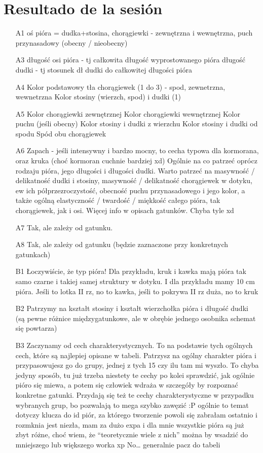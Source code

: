 \documentclass[a4paper,12pt]{article}
\begin{document}
\section{Resultado de la sesión}
\begin{itemize}
	\item[A1] oś pióra = dudka+stosina, chorągiewki - zewnętrzna i wewnętrzna, puch przynasadowy (obecny / nieobecny)
	\item[A3] długość osi pióra - tj całkowita długość wyprostowanego pióra
	długość dudki - tj stosunek dł dudki do całkowitej długości pióra
	\item[A4] Kolor podstawowy tła chorągiewek (1 do 3) - spod, zewnetrzna, wewnetrzna
	Kolor stosiny (wierzch, spod) i dudki (1)
	\item[A5] Kolor chorągiewki zewnętrznej
	Kolor chorągiewki wewnętrznej
	Kolor puchu (jeśli obecny)
	Kolor stosiny i dudki z wierzchu
	Kolor stosiny i dudki od spodu
	Spód obu chorągiewek
	\item[A6] Zapach - jeśli intensywny i bardzo mocny, to cecha typowa dla kormorana, oraz kruka (choć kormoran cuchnie bardziej xd)
	Ogólnie na co patrzeć oprócz rodzaju pióra, jego długości i długości dudki. Warto patrzeć na masywność / delikatność dudki i stosiny, masywność / delikatność chorągiewek w dotyku, ew ich półprzezroczystość, obecność puchu przynasadowego i jego kolor, a także ogólną elastyczność / twardość / miękkość całego pióra, tak chorągiewek, jak i osi. Więcej info w opisach gatunków. Chyba tyle xd
	\item[A7] Tak, ale zależy od gatunku.
	\item[A8] Tak, ale zależy od gatunku (będzie zaznaczone przy konkretnych gatunkach)
	\item[B1] Łoczywiście, że typ pióra! Dla przykładu, kruk i kawka mają pióra tak samo czarne i takiej samej struktury w dotyku. I dla przykładu mamy 10 cm pióra. Jeśli to lotka II rz, no to kawka, jeśli to pokrywa II rz duża, no to kruk
	\item[B2] Patrzymy na kształt stosiny i kształt wierzchołka pióra i długość dudki (są pewne różnice międzygatunkowe, ale w obrębie jednego osobnika schemat się powtarza)
	\item[B3] Zaczynamy od cech charakterystycznych. To na podstawie tych ogólnych cech, które są najlepiej opisane w tabeli. Patrzysz na ogólny charakter pióra i przypasowujesz go do grupy, jednej z tych 15 czy ilu tam mi wyszło. To chyba jedyny sposób, tu już trzeba niestety te cechy po kolei sprawdzić, jak ogólnie pióro się miewa, a potem się człowiek wdraża w szczegóły by rozpoznać konkretne gatunki. Przydają się też te cechy charakterystyczne w przypadku wybranych grup, bo pozwalają to mega szybko zawęzić :P ogólnie to temat dotyczy klucza do id piór, za którego tworzenie powoli się zabrałam ostatnio i rozmknia jest niezła, mam za dużo expa i dla mnie wszystkie pióra są już zbyt różne, choć wiem,  że “teoretycznie wiele z nich” można by wsadzić do mniejszego lub większego worka xp No… generalnie pacz do tabeli
\end{itemize}
\end{document}
